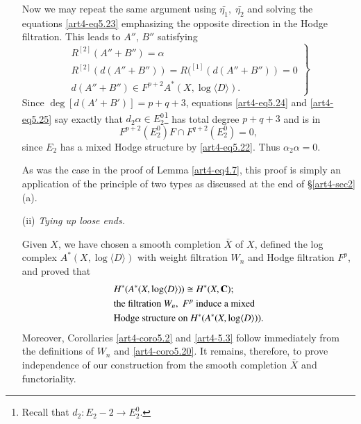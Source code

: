 \begin{enumerate}
Now we may repeat the same argument using $\bar{\eta_1},\; \bar{\eta_2}$ and solving the equations \eqref{art4-eq5.23} emphasizing the opposite direction in the Hodge filtration. This leads to $A''$, $B''$ satisfying
\begin{equation}
\left.
\begin{array}{c}
R^{[2]} (A'' + B'') =\alpha\\
R^{[2]} (d (A''+B'')) = R(^{[1]} (d (A''+B'')) =0\\
d(A''+B'') \in F^{p+2} A^\ast (X, \log \langle D \rangle).
\end{array}
\right\} \label{art4-eq5.24}
\end{equation}
Since $\deg [d(A'+ B')] = p + q +3$, equations \eqref{art4-eq5.24} and \eqref{art4-eq5.25} say exactly that $d_2 \alpha \in E^0_2$\footnote[23]{Recall that $d_2 : E_2 -2 \to E^0_2$.} has total degree $p+q+3$ and is in 
$$
F^{p+2} (E^0_2) F \cap F^{q+2} (E^0_2) = 0,
$$
since $E_2$ has a mixed Hodge structure by \eqref{art4-eq5.22}. Thus $\alpha_2 \alpha = 0$.

\begin{remark*}
As was the case in the proof of Lemma \eqref{art4-eq4.7}, this proof is simply an application of the principle of two types as discussed at the end of \S \eqref{art4-sec2} (a).
\end{remark*}

\item[(ii)] \textit{Tying up loose ends.}

Given $X$, we have chosen a smooth completion $\bar{X}$ of $X$, defined the log complex $A^\ast (X, \log \langle D \rangle)$ with weight filtration $W_n$ and Hodge filtration $F^p$, and proved that 
\begin{align*}
& H^\ast (A^\ast (X, \log \langle D \rangle )) \cong H^\ast (X, \mathbf{C});\\
& \text{the filtration $W_n, \; F^p$ induce a mixed} \\
& \text{Hodge structure on $H^\ast (A^\ast (X, \log \langle D \rangle))$.}
\end{align*}\pageoriginale
Moreover, Corollaries \eqref{art4-coro5.2} and \eqref{art4-5.3} follow immediately from the definitions of $W_n$ and \eqref{art4-coro5.20}. It remains, therefore, to prove independence of our construction from the smooth completion $\bar{X}$ and functoriality.


\end{enumerate}
